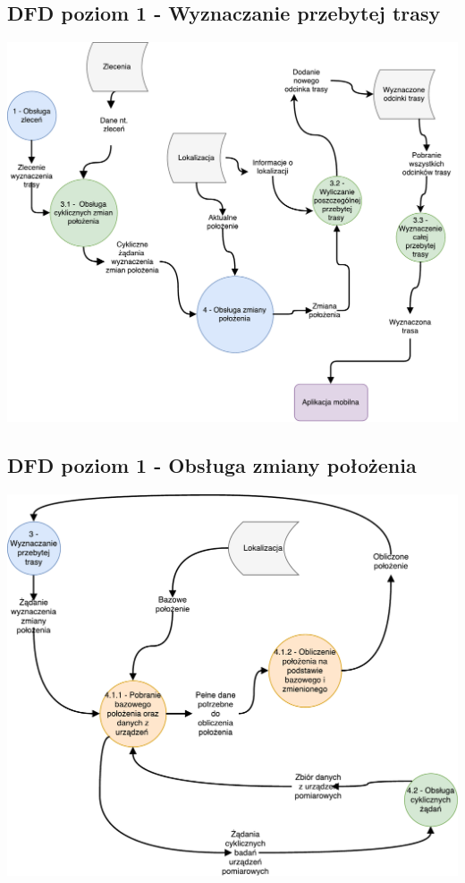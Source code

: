 \documentclass[11pt]{article}
\begin{document}
	\subsection{DFD poziom 1 - Wyznaczanie przebytej trasy}
	\begin{center}
		\includegraphics[scale=0.6]{DFD3.pdf}
	\end{center}
	\subsection{DFD poziom 1 - Obsługa zmiany położenia}
	\begin{center}
		\includegraphics[scale=0.6]{DFD4.pdf}
	\end{center}
	\newpage
\end{document}
